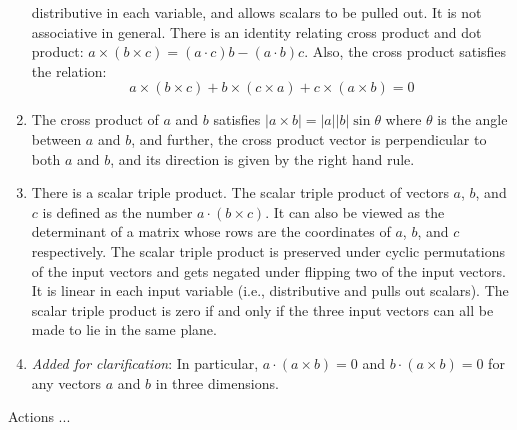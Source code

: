 \documentclass[10pt]{amsart}
\begin{document}
\begin{enumerate}
  distributive in each variable, and allows scalars to be pulled
  out. It is not associative in general. There is an identity relating
  cross product and dot product: $a \times (b \times c) = (a \cdot c)b
  - (a \cdot b)c$. Also, the cross product satisfies the relation: $$a
  \times (b \times c) + b \times (c \times a) + c \times (a \times b)
  = 0$$
\item The cross product of $a$ and $b$ satisfies $|a \times b| =
  |a||b| \sin \theta$ where $\theta$ is the angle between $a$ and $b$,
  and further, the cross product vector is perpendicular to both $a$
  and $b$, and its direction is given by the right hand rule.
\item There is a scalar triple product. The scalar triple product of
  vectors $a$, $b$, and $c$ is defined as the number $a \cdot (b
  \times c)$. It can also be viewed as the determinant of a matrix
  whose rows are the coordinates of $a$, $b$, and $c$
  respectively. The scalar triple product is preserved under cyclic
  permutations of the input vectors and gets negated under flipping
  two of the input vectors. It is linear in each input variable (i.e.,
  distributive and pulls out scalars). The scalar triple product is
  zero if and only if the three input vectors can all be made to lie
  in the same plane.
\item {\em Added for clarification}: In particular, $a \cdot (a \times
  b) = 0$ and $b \cdot (a \times b) = 0$ for any vectors $a$ and $b$
  in three dimensions.
\end{enumerate}

Actions ...
\end{document}
